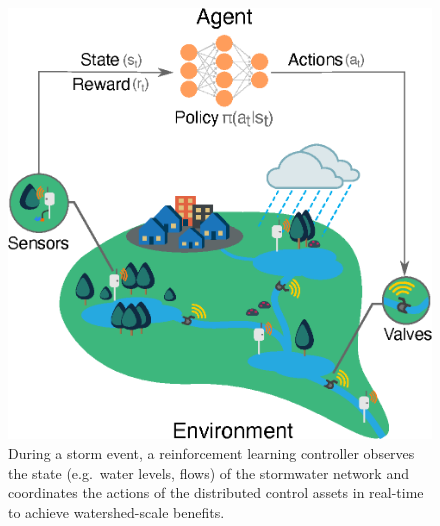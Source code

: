 \begin{figure}
    \centering
    \includegraphics[width=\textwidth]{gfx/Chapter-3/RL_main_fig_1_final.eps}
    \caption{During a storm event, a reinforcement learning controller observes the state (e.g.\ water levels, flows)  of the stormwater network and coordinates the actions of the distributed control assets in real-time to achieve watershed-scale benefits.}
    \label{fig:1}
\end{figure}

